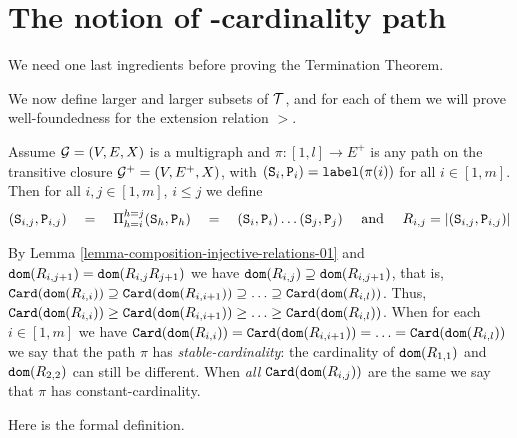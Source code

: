 \documentclass{lmcs}
\begin{document}
\section{The notion of 
-cardinality path}
We need one last ingredients before proving the Termination Theorem.

We now define larger and larger subsets of ${\mathcal T}$, and for each of them 
we will prove well-foundedness for the extension relation $>$.

Assume ${\mathcal G}=(V,E,X)$ is a multigraph and $\pi:[1,l] \rightarrow E^+$ 
is any path on the transitive closure ${\mathcal G}^+=(V,E^+,X)$,
with $({\tt S}_i,{\tt P}_i) = {\tt label}(\pi(i))$ for all $i \in[1,m]$.
Then for all $i,j \in[1,m]$, $i \le j$ we define
$$
({\tt S}_{i,j},{\tt P}_{i,j}) \ \ \ = \ \ \
\Pi_{h=i}^{h=j} ({\tt S}_h,{\tt P}_h) \ \ \ = \ \ \
({\tt S}_i,{\tt P}_i) \ldots ({\tt S}_j,{\tt P}_j)
\mbox{ \ \ \ and \ \ \ }
R_{i,j} = {| ({\tt S}_{i,j},{\tt P}_{i,j}) |}
$$

By Lemma \ref{lemma-composition-injective-relations-01} 
and ${\tt dom}(R_{i,j+1}) = {\tt dom}(R_{i,j} R_{j+1})$ we have
${\tt dom}(R_{i,j})  \supseteq {\tt dom}(R_{i,j+1})$, that is,
${\tt Card}({\tt dom}(R_{i,i})) \supseteq {\tt Card}({\tt dom}(R_{i,i+1}))
\supseteq \ldots \supseteq {\tt Card}({\tt dom}(R_{i,l}))$. Thus, 
${\tt Card}({\tt dom}(R_{i,i})) \ge {\tt Card}({\tt dom}(R_{i,i+1})) \ge \ldots \ge {\tt Card}({\tt dom}(R_{i,l}))$.
When for each $i \in[1,m]$  we have 
${\tt Card}({\tt dom}(R_{i,i})) = {\tt Card}({\tt dom}(R_{i,i+1})) = \ldots = {\tt Card}({\tt dom}(R_{i,l}))$ 
we say that the path $\pi$ has \emph{stable-cardinality}: the cardinality
of ${\tt dom}(R_{1,1})$ and ${\tt dom}(R_{2,2})$ can still be different.
When \emph{all} ${\tt Card}({\tt dom}(R_{i,j}))$ are the same we
say that $\pi$ has constant-cardinality.

Here is the formal definition.
\end{document}
